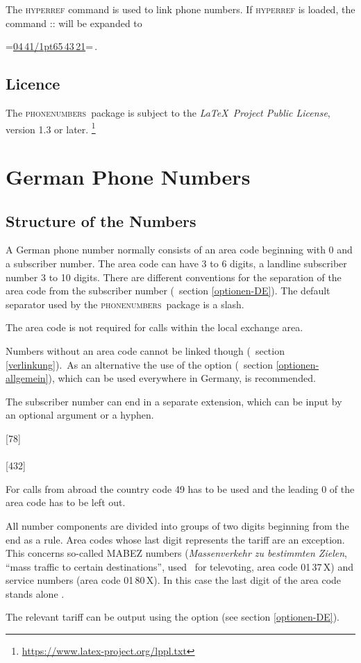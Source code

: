 \documentclass[numbers=noenddot]{scrreprt}
\newcommand\Abschnittsliteratur[1]{\bgroup
\small
\raggedright
\printbibliography[heading=subbibnumbered,keyword=#1]
\egroup}
\newcommand*\Paket[1]{\textsc{#1}}
\newcommand\phone{\textcolor{cnltx}{\Paket{phone\-numbers}}}
\newcommand\UeberschriftAufbau{\section{Structure of the Numbers}}
\newcommand\KeineVerlinkung{Numbers without an area code cannot be linked though
\vglAbschnitt{verlinkung}.}
\newcommand*\vglAbschnitt[1]{(\cf\ section \ref{#1})}
\newcommand*\sieheAbschnitt[1]{(see section \ref{#1})}
\newcommand*\AufbauDEATA[6]{ #1 phone number normally consists of an area code beginning with 0 and a subscriber number. The area code can have #2 to #3 digits, a landline subscriber number #4 to #5 digits. There are different conventions for the separation of the area code from the subscriber number
\vglAbschnitt{#6}.
The default separator used by the \phone\ package is a slash.}
\newcommand\AufbauDEATB{The area code is not required for calls within the local exchange area.}
\newcommand\AufbauDEATC[1]{\KeineVerlinkung\ As an alternative the use of the \option{home-area-code} option
\vglAbschnitt{optionen-allgemein},
which can be used everywhere in #1, is recommended.\par
The subscriber number can end in a separate extension, which can be input by an optional argument or a hyphen.}
\newcommand*\AufbauDEATD[1]{For calls from abroad the country code #1 has to be used and the leading 0 of the area code has to be left out.}
\begin{document}
The \Paket{hyperref} command  is used to link phone numbers. If \Paket{hyperref} is loaded, the command
\verbcode::
will be expanded to
\begin{center}
\verbcode=\href{tel:+49441654321}{04\,41\kern1pt\slash\kern1pt65\,43\,21}=\,.
\end{center}


\section{Licence}
The \phone\ package is subject to the
\emph{\LaTeX\ Project Public License},
version 1.3 or later.%
\footnote{\url{https://www.latex-project.org/lppl.txt}}

\Abschnittsliteratur{general}

\chapter{German Phone Numbers}
\UeberschriftAufbau
\AufbauDEATA{A German}{3}{6}{3}{10}{optionen-DE}
\begin{sidebyside}
\end{sidebyside}

\AufbauDEATB
\begin{sidebyside}
\end{sidebyside}
\AufbauDEATC{Germany}
\begin{sidebyside}
  [78] \\
   \\
  [432] \\
\end{sidebyside}

\AufbauDEATD{49}
\begin{sidebyside}
\end{sidebyside}

All number components are divided into groups of two digits beginning from the end as a rule. Area codes whose last digit represents the tariff are an exception. This concerns so-called MABEZ numbers (\emph{Massenverkehr zu bestimmten Zielen}, \enquote{mass traffic to certain destinations}, used \eg\ for televoting, area code 01\,37\,X) and service numbers (area code 01\,80\,X). In this case the last digit of the area code stands alone
\cite[110]{duden}.
\begin{sidebyside}
\end{sidebyside}
The relevant tariff can be output using the
 option
\sieheAbschnitt{optionen-DE}.
\end{document}
